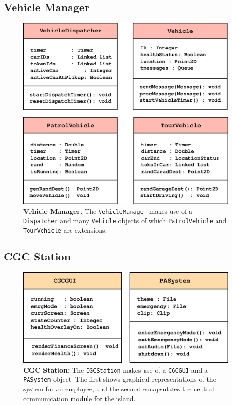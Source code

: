 \documentclass[12pt]{article}
\begin{document}
\subsection{Vehicle Manager}
\begin{figure}[H]
    \centerline{\includegraphics[scale=0.8]{VManager.png}}
    \caption{\textbf{Vehicle Manager:} The \texttt{VehicleManager} makes use of a \texttt{Dispatcher} and many \texttt{Vehicle} objects
    of which \texttt{PatrolVehicle} and \texttt{TourVehicle} are extensions.}
    \label{fig:vmanager}
\end{figure}


\subsection{CGC Station}
\begin{figure}[H]
    \centerline{\includegraphics[scale=0.8]{CStation.png}}
    \caption{\textbf{CGC Station:} The \texttt{CGCStation} makes use of a \texttt{CGCGUI} and a \texttt{PASystem} object.
    The first shows graphical representations of the system for an employee, and the second encapsulates the central 
    communication module for the island.}
    \label{fig:cstation}
\end{figure}
\end{document}
